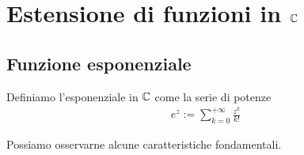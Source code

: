 
\chapter{Estensione di funzioni in $\mathbb{C}$}

\section{Funzione esponenziale}

\begin{definition}
	\label{defn:funzione-esponenziale}
	Definiamo l'esponenziale in $\mathbb{C}$ come la serie di potenze
	\begin{equation}
	\begin{aligned}
		e^z := \sum^{+\infty}_{k=0} \frac{z^k}{k!}
	\end{aligned}
	\end{equation}
\end{definition}

Possiamo osservarne alcune caratteristiche fondamentali. 

